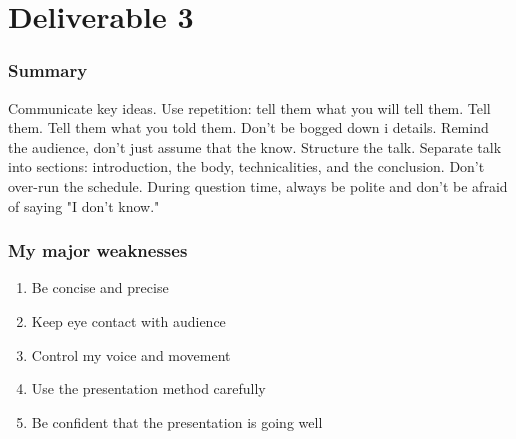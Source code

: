 \section{Deliverable 3}

\subsubsection{Summary}

Communicate key ideas. Use repetition: tell them what you will tell them. Tell them. Tell them what you told them.
Don't be bogged down i details. Remind the audience, don't just assume that the know.
Structure the talk. 
Separate talk into sections: introduction, the body, technicalities, and the conclusion.
Don't over-run the schedule. 
During question time, always be polite and don't be afraid of saying "I don't know."

\subsubsection{My major weaknesses}
\begin{enumerate}
  \item Be concise and precise
  \item Keep eye contact with audience
  \item Control my voice and movement
  \item Use the presentation method carefully
  \item Be confident that the presentation is going well
\end{enumerate}


